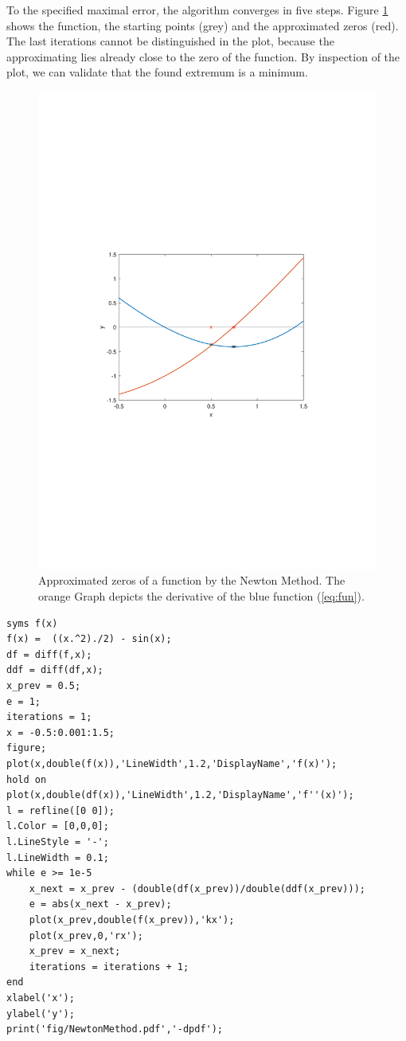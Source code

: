 To the specified maximal error, the algorithm converges in five steps. Figure \ref{fig:newton} shows the function, the starting points (grey) and the approximated zeros (red). The last iterations cannot be distinguished in the plot, because the approximating lies already close to the zero of the function. By inspection of the plot, we can validate that the found extremum is a minimum.
\clearpage
\begin{figure}[!htb]
    \centering
    \includegraphics[trim={60 260 50 260},clip, width=.8\linewidth]{./homework3/img/NewtonMethod.pdf}
    \caption{Approximated zeros of a function by the Newton Method. The orange Graph depicts the derivative of the blue function (\ref{eq:fun}).}
    \label{fig:newton}
\end{figure}

\begin{lstlisting}
syms f(x)
f(x) =  ((x.^2)./2) - sin(x);
df = diff(f,x);
ddf = diff(df,x);
x_prev = 0.5;
e = 1;
iterations = 1;
x = -0.5:0.001:1.5;
figure;
plot(x,double(f(x)),'LineWidth',1.2,'DisplayName','f(x)');
hold on
plot(x,double(df(x)),'LineWidth',1.2,'DisplayName','f''(x)');
l = refline([0 0]);
l.Color = [0,0,0];
l.LineStyle = '-';
l.LineWidth = 0.1;
while e >= 1e-5
    x_next = x_prev - (double(df(x_prev))/double(ddf(x_prev)));
    e = abs(x_next - x_prev);  
    plot(x_prev,double(f(x_prev)),'kx');
    plot(x_prev,0,'rx');
    x_prev = x_next;
    iterations = iterations + 1;
end
xlabel('x');
ylabel('y');
print('fig/NewtonMethod.pdf','-dpdf');
\end{lstlisting}